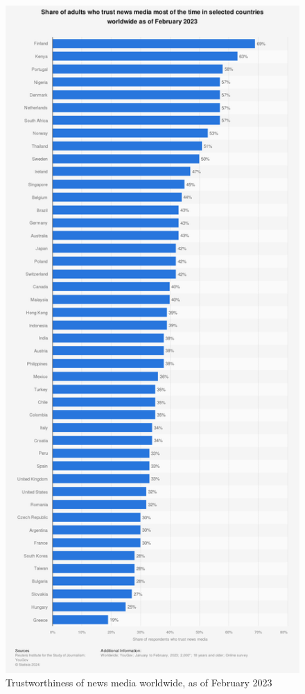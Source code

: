 \begin{figure}[htbp]
    \centering
    \includegraphics[width=0.6\linewidth]{images/statistic_id308468_trustworthiness-of-news-media-worldwide-2023.png}
    \caption{Trustworthiness of news media worldwide, as of February 2023 \cite{reuters-2023-trust}}
\label{fig:trustworthiness-of-news-media-worldwide-2023}
\end{figure}



